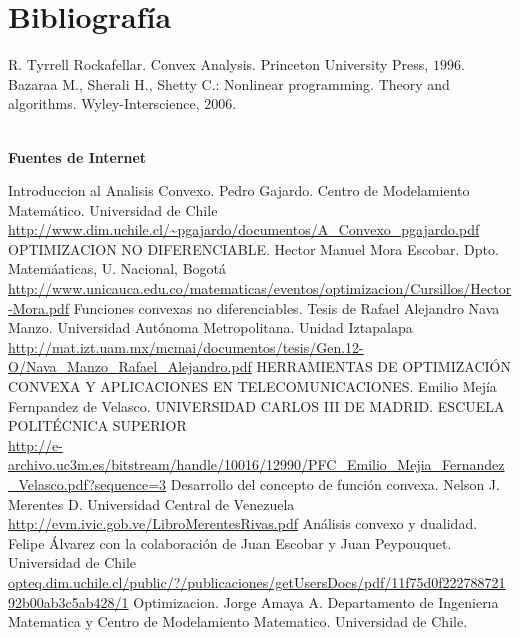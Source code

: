 \section{Bibliograf\'ia}

\begin{thebibliography}{99}
   R. Tyrrell Rockafellar. Convex Analysis. Princeton University Press, $1996$.
   Bazaraa M., Sherali H., Shetty C.: Nonlinear programming. Theory and algorithms. Wyley-Interscience, $2006$.
\end{thebibliography}

~\\


\textbf{\large Fuentes de Internet}
\begin{thebibliography}{99}
   Introduccion al Analisis Convexo. Pedro Gajardo. Centro de Modelamiento Matemático. Universidad de Chile\\
		  \url{http://www.dim.uchile.cl/~pgajardo/documentos/A_Convexo_pgajardo.pdf}
   OPTIMIZACION NO DIFERENCIABLE. Hector Manuel Mora Escobar. Dpto. Matem\'aaticas, U. Nacional, Bogot\'a\\
		 \url{http://www.unicauca.edu.co/matematicas/eventos/optimizacion/Cursillos/Hector-Mora.pdf}
   Funciones convexas no diferenciables. Tesis de Rafael Alejandro Nava Manzo. Universidad Autónoma Metropolitana. Unidad
		  Iztapalapa\\
		  \url{http://mat.izt.uam.mx/mcmai/documentos/tesis/Gen.12-O/Nava_Manzo_Rafael_Alejandro.pdf}
   HERRAMIENTAS DE OPTIMIZACIÓN CONVEXA Y APLICACIONES EN TELECOMUNICACIONES. Emilio Mejía Fernpandez de Velasco. UNIVERSIDAD
		   CARLOS III DE MADRID. ESCUELA POLITÉCNICA SUPERIOR\\
		   \url{http://e-archivo.uc3m.es/bitstream/handle/10016/12990/PFC_Emilio_Mejia_Fernandez_Velasco.pdf?sequence=3}
 Desarrollo del concepto de función convexa. Nelson J. Merentes D. Universidad Central de Venezuela\\
		\url{http://evm.ivic.gob.ve/LibroMerentesRivas.pdf}
 Análisis convexo y dualidad. Felipe Álvarez con la colaboración de Juan Escobar y Juan Peypouquet. Universidad de Chile\\
		\url{opteq.dim.uchile.cl/public/?/publicaciones/getUsersDocs/pdf/11f75d0f22278872192b00ab3c5ab428/1}
 Optimizacion. Jorge Amaya A. Departamento de Ingenierıa Matematica y Centro de Modelamiento Matematico. Universidad 
		de Chile.\\

\end{thebibliography}
